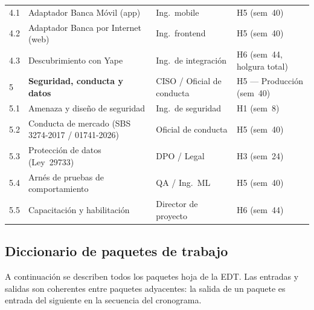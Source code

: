 \documentclass[11pt]{article}
\begin{document}
\begin{longtable}{@{}p{1.0cm} p{5.8cm} p{3.1cm} p{3.9cm}@{}}
4.1 & \quad Adaptador Banca Móvil (app)           & Ing.\ mobile              & H5 (sem~40) \\
4.2 & \quad Adaptador Banca por Internet (web)    & Ing.\ frontend            & H5 (sem~40) \\
4.3 & \quad Descubrimiento con Yape               & Ing.\ de integración      & H6 (sem~44, holgura total) \\[0.4em]
\midrule
5   & \textbf{Seguridad, conducta y datos}        & CISO / Oficial de conducta & H5 — Producción (sem~40) \\
5.1 & \quad Amenaza y diseño de seguridad         & Ing.\ de seguridad        & H1 (sem~8) \\
5.2 & \quad Conducta de mercado (SBS 3274-2017 / 01741-2026) & Oficial de conducta & H5 (sem~40) \\
5.3 & \quad Protección de datos (Ley~29733)       & DPO / Legal               & H3 (sem~24) \\
5.4 & \quad Arnés de pruebas de comportamiento    & QA / Ing.\ ML             & H5 (sem~40) \\
5.5 & \quad Capacitación y habilitación           & Director de proyecto      & H6 (sem~44) \\
\end{longtable}

\subsection{Diccionario de paquetes de trabajo}

A continuación se describen todos los paquetes hoja de la EDT. Las entradas y salidas son coherentes entre paquetes adyacentes: la salida de un paquete es entrada del siguiente en la secuencia del cronograma.
\end{document}
